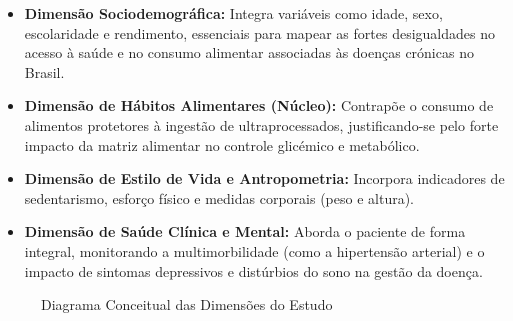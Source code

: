 \documentclass[12pt, a4paper]{article}
\begin{document}
    \begin{itemize}
        \item \textbf{Dimensão Sociodemográfica:} Integra variáveis como idade, sexo, escolaridade e rendimento, essenciais para mapear as fortes desigualdades no acesso à saúde e no consumo alimentar associadas às doenças crónicas no Brasil.
    
        \item \textbf{Dimensão de Hábitos Alimentares (Núcleo):} Contrapõe o consumo de alimentos protetores à ingestão de ultraprocessados, justificando-se pelo forte impacto da matriz alimentar no controle glicémico e metabólico.
    
        \item \textbf{Dimensão de Estilo de Vida e Antropometria:} Incorpora indicadores de sedentarismo, esforço físico e medidas corporais (peso e altura).
    
        \item \textbf{Dimensão de Saúde Clínica e Mental:} Aborda o paciente de forma integral, monitorando a multimorbilidade (como a hipertensão arterial) e o impacto de sintomas depressivos e distúrbios do sono na gestão da doença.
    \end{itemize}

    
\begin{figure}[h]
\centering
{}
\vspace{0.5cm}
\caption{Diagrama Conceitual das Dimensões do Estudo}

\label{fig:dimensoes}
\vspace{0.5cm}
\end{figure}
\end{document}
